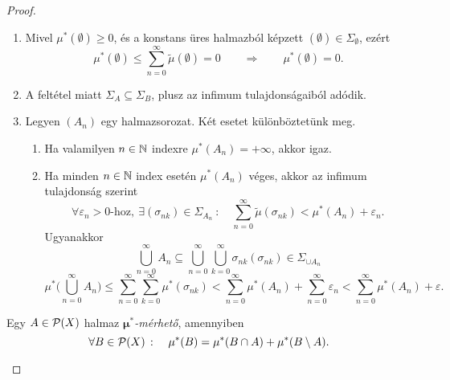 \documentclass[
]{elteikthesis}[2024/04/26]
\begin{document}
\begin{proof}
\begin{proof*}
\begin{enumerate}
				\item 
				Mivel \( \mu^*(\emptyset) \geq 0 \), és a konstans üres halmazból képzett \( (\emptyset) \in \Sigma_\emptyset \), ezért
				\[
					\mu^*(\emptyset) \leq \sum_{n=0}^{\infty} \widetilde{\mu}( \emptyset ) = 0
					\qquad \Longrightarrow \qquad
					\mu^*(\emptyset) = 0.
				\]
				
				\item
				A feltétel miatt \( \Sigma_A \subseteq \Sigma_B \), 
				plusz az infimum tulajdonságaiból adódik.
				
				\item Legyen \( (A_n) \) egy halmazsorozat. Két esetet különböztetünk meg.
				\begin{enumerate}
					\item 
					Ha valamilyen \( n \in \mathbb{N} \) indexre \(  \mu^*(A_n) = +\infty \), akkor igaz.
					
					\item 
					Ha minden \( n \in \mathbb{N} \) index esetén \( \mu^*(A_n) \) véges, 
					akkor az infimum tulajdonság szerint
					\[
						\forall \varepsilon_n > 0 \text{-hoz}, \
						\exists ( \sigma_{nk} ) \in \Sigma_{A_n} \ \colon \quad
						\sum_{n=0}^{\infty} \widetilde{ \mu }( \sigma_{nk} ) < \mu^*(A_n) + \varepsilon_n.
					\]
					Ugyanakkor
					\[
						\bigcup_{n=0}^{\infty} A_n \subseteq 
						\bigcup_{n=0}^{\infty} \bigcup_{k=0}^{\infty} \sigma_{nk}
						(\sigma_{nk}) \in \Sigma_{\cup A_n }
					\]
					\[
						\mu^* \Biggl( \bigcup_{n=0}^{\infty} A_n \Biggr) \leq
						\sum_{n=0}^{\infty} \sum_{k=0}^{\infty} \mu^*( \sigma_{nk} ) < 
						\sum_{n=0}^{\infty} \mu^*( A_n ) + 
						\sum_{n=0}^{\infty} \varepsilon_n < 
						\sum_{n=0}^{\infty} \mu^*( A_n ) + \varepsilon.
					\]
				\end{enumerate}
			\end{enumerate}
		\end{proof*}
		
		\begin{tcolorbox}[colback=yellow!30, colframe=yellow!80]
			\begin{def*}
				Egy \( A \in \mathcal{P}( X ) \) halmaz \emph{\( \boldsymbol{\mu^*} \)-mérhető}, amennyiben
				\[
					\forall B \in \powerset{X} \ \colon \quad
					\mu^*(B) = \mu^*(B \cap A) + \mu^*(B \setminus A).
				\]
			\end{def*}
		\end{tcolorbox}
		

\end{proof}
\end{document}
